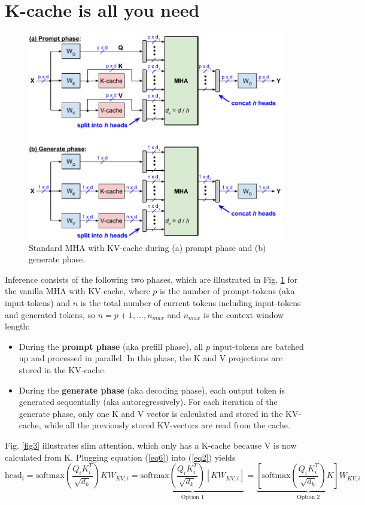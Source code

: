\documentclass{article}
\numberwithin{equation}{section} %
\begin{document}
\section{K-cache is all you need}
\begin{figure}[h!] \centering
  \includegraphics[scale=0.9]{figs/slim_fig2.pdf}
  \caption{Standard MHA with KV-cache during (a) prompt phase and (b) generate phase.}
\label{fig2} \end{figure}
Inference consists of the following two phases, which are illustrated in Fig. \ref{fig2} for the vanilla MHA with KV-cache, where $p$ is the number of prompt-tokens (aka input-tokens) and $n$ is the total number of current tokens including input-tokens and generated tokens, so $n = p+1, \ldots, n_{max}$ and $n_{max}$ is the context window length:
\begin{itemize}[topsep=-1pt, itemsep=-1pt]
  \item During the \textbf{prompt phase} (aka prefill phase), all $p$ input-tokens are batched up and processed in parallel. In this phase, the K and V projections are stored in the KV-cache.
  \item During the \textbf{generate phase} (aka decoding phase), each output token is generated sequentially (aka autoregressively). For each iteration of the generate phase, only one K and V vector is calculated and stored in the KV-cache, while all the previously stored KV-vectors are read from the cache.
\end{itemize}

Fig. \ref{fig3} illustrates slim attention, which only has a K-cache because V is now calculated from K. Plugging equation (\ref{eq6}) into (\ref{eq2}) yields
\begin{equation}
  \text{head}_i = \text{softmax} \left( \frac{Q_i K_i^T}{\sqrt{d_k}} \right) K W_{KV,i}
  = \underbrace{ \text{softmax} \left( \frac{Q_i K_i^T}{\sqrt{d_k}} \right) \left[ K W_{KV,i} \right] }_{\text{Option 1}}
  = \underbrace{ \left[ \text{softmax} \left( \frac{Q_i K_i^T}{\sqrt{d_k}} \right) K \right] W_{KV,i} }_{\text{Option 2}}
\label{eq7} \end{equation}
\end{document}

